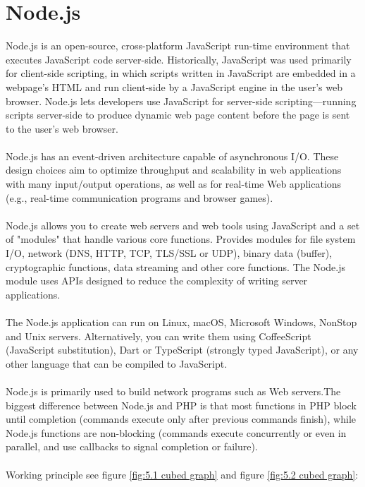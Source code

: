 \section{Node.js}
Node.js is an open-source, cross-platform JavaScript run-time environment that executes JavaScript code server-side. Historically, JavaScript was used primarily for client-side scripting, in which scripts written in JavaScript are embedded in a webpage's HTML and run client-side by a JavaScript engine in the user's web browser. Node.js lets developers use JavaScript for server-side scripting—running scripts server-side to produce dynamic web page content before the page is sent to the user's web browser. \\ \\ Node.js has an event-driven architecture capable of asynchronous I/O. These design choices aim to optimize throughput and scalability in web applications with many input/output operations, as well as for real-time Web applications (e.g., real-time communication programs and browser games). \\ \\  Node.js allows you to create web servers and web tools using JavaScript and a set of "modules" that handle various core functions. Provides modules for file system I/O, network (DNS, HTTP, TCP, TLS/SSL or UDP), binary data (buffer), cryptographic functions, data streaming and other core functions. The Node.js module uses APIs designed to reduce the complexity of writing server applications. \\ \\ The Node.js application can run on Linux, macOS, Microsoft Windows, NonStop and Unix servers. Alternatively, you can write them using CoffeeScript (JavaScript substitution), Dart or TypeScript (strongly typed JavaScript), or any other language that can be compiled to JavaScript.\\ \\ Node.js is primarily used to build network programs such as Web servers.The biggest difference between Node.js and PHP is that most functions in PHP block until completion (commands execute only after previous commands finish), while Node.js functions are non-blocking (commands execute concurrently or even in parallel, and use callbacks to signal completion or failure). \\ \\ Working principle see figure \ref{fig:5.1 cubed graph} and figure \ref{fig:5.2 cubed graph}:
